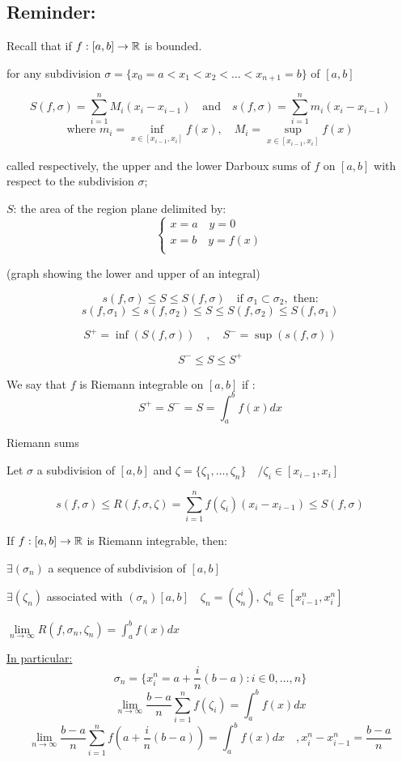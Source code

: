 \vspace{2em}
\subsection{Reminder:}
Recall that if $f: \left[a,b\right] \to \mathbb{R}$ is bounded.

for any subdivision $\sigma = \{ x_0=a <x_1< x_2<...< x_{n+1} = b\}$ of  $\left[a,b\right]$

\[S(f,\sigma)= \sum_{i = 1}^{n}M_i(x_i - x_{i-1}) \quad \text{and} \quad s(f,\sigma)= \sum_{i = 1}^{n}m_i(x_i - x_{i-1})\]
\[\text{where } m_i = \inf_{x \in [x_{i-1},x_i]} f(x), \quad M_i = \sup_{x \in [x_{i-1},x_i]} f(x)\]

called respectively, the upper and the lower Darboux sums of $f$
on $\left[a, b\right]$ with respect to the subdivision $\sigma$;

$S$: the area of the region plane delimited by:
\[
\begin{cases}
  x=a \quad y = 0 \\
  x=b \quad y = f(x) \\
\end{cases}
\]

(graph showing the lower and upper of an integral)

\[s(f,\sigma) \le S \le S(f,\sigma)\quad \text{if } \sigma_1 \subset \sigma_2,\text{ then:}\]
\[s(f,\sigma_1)  \le s(f,\sigma_2) \le S \le S(f,\sigma_2) \le S(f,\sigma_1)\]

\[
S^+ = \inf (S(f,\sigma))\quad , \quad S^- = \sup (s(f,\sigma))
\]

\[
S^- \le S \le S^+
\]

\begin{definition}
  We say that $f$ is Riemann integrable on $\left[a,b\right]$ if :
  \[S^+ = S^- = S = \int_a^b f(x)dx\]
\end{definition}

\begin{definition}
  Riemann sums

  Let $\sigma$ a subdivision of $\left[a,b\right]$ and $\zeta = \{\zeta_1,\dots,\zeta_n\} \quad / \zeta_i \in \left[x_{i-1}, x_i\right]$

  \[s(f,\sigma) \le R(f,\sigma,\zeta) = \sum_{i=1}^{n}f(\zeta_i)(x_i-x_{i-1}) \le S(f,\sigma)\]

  If $f: \left[a,b\right] \to \mathbb{R}$ is Riemann integrable, then:

  $\exists (\sigma_n)$ a sequence of subdivision of $\left[a,b\right]$

$\exists (\zeta_n)$ associated with 
$(\sigma_n)[a,b]\quad \zeta_n = (\zeta_n^i),\ \zeta_n^i \in [x_{i-1}^n, x_i^n]$

  $\lim\limits_{n \to \infty}R(f, \sigma_n,\zeta_n) = \int_a^bf(x)dx$

\underline{In particular:}
\[\sigma_n = \{x_i^n= a + \frac{i}{n}(b-a): i\in {0,\dots,n}\}\]
\[\lim\limits_{n \to \infty} \frac{b-a}{n} \sum_{i = 1}^{n} f(\zeta_i) = \int_a^b f(x)dx\]
\[\lim\limits_{n \to \infty} \frac{b-a}{n} \sum_{i = 1}^{n}f(a+ \frac{i}{n}(b-a)) = \int_a^bf(x)dx \quad, x_i^n-x^n_{i-1} = \frac{b-a}{n}\]
\end{definition}

